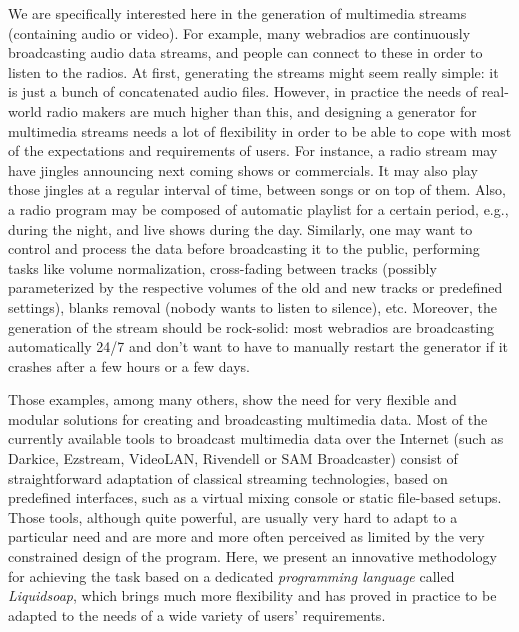 \documentclass{llncs}
\newcommand{\eg}{{e.g.},}
\newcommand{\TODO}[1]{\marginpar{\tiny #1}}
\begin{document}
We are specifically interested here in the generation of multimedia streams
(containing audio or video). For example, many webradios are continuously
broadcasting audio data streams, and people can connect to these in order to
listen to the radios. At first, generating the streams might seem really simple:
it is just a bunch of concatenated audio files. However, in practice the needs
of real-world radio makers are much higher than this, and designing a generator
for multimedia streams needs a lot of flexibility in order to be able to cope
with most of the expectations and requirements of users. For instance, a radio
stream may have jingles announcing next coming shows or commercials. It may also
play those jingles at a regular interval of time, between songs or on top of
them. Also, a radio program may be composed of automatic playlist for a certain
period, \eg{} during the night, and live shows during the day. Similarly, one
may want to control and process the data before broadcasting it to the public,
performing tasks like volume normalization, cross-fading between tracks
(possibly parameterized by the respective volumes of the old and new tracks or
predefined settings), blanks removal (nobody wants to listen to silence),
etc. Moreover, the generation of the stream should be rock-solid: most webradios
are broadcasting automatically 24/7 and don't want to have to manually restart
the generator if it crashes after a few hours or a few days.

Those examples, among many others, show the need for very flexible and modular
solutions for creating and broadcasting multimedia data. Most of the currently
available tools to broadcast multimedia data over the Internet (such as Darkice,
Ezstream, VideoLAN, Rivendell or SAM Broadcaster) consist of straightforward
adaptation of classical streaming technologies, based on
predefined interfaces, such as a virtual mixing console or static file-based
setups. Those tools, although quite powerful, are usually very hard to adapt to
a particular need and are more and more often perceived as limited by the very
\TODO{DB "new" c'est abusé}
\TODO{RB c ok avec innovative ?}
constrained design of the program. Here, we present an innovative methodology for
achieving the task based on a dedicated \emph{programming language} called
\emph{Liquidsoap}, which brings much more flexibility and has proved in practice
to be adapted to the needs of a wide variety of users' requirements.
\end{document}
